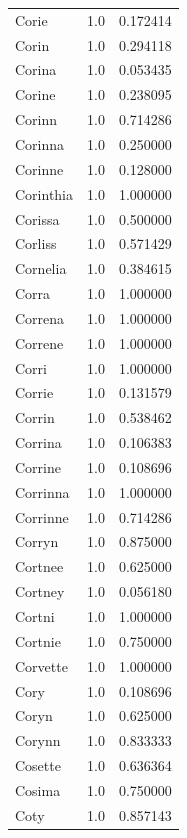 \documentclass[
  letterpaper,
  DIV=11,
  numbers=noendperiod]{scrreprt}
\begin{document}
\begin{tabular}{lrr}
Corie           &   1.0 &   0.172414 \\
Corin           &   1.0 &   0.294118 \\
Corina          &   1.0 &   0.053435 \\
Corine          &   1.0 &   0.238095 \\
Corinn          &   1.0 &   0.714286 \\
Corinna         &   1.0 &   0.250000 \\
Corinne         &   1.0 &   0.128000 \\
Corinthia       &   1.0 &   1.000000 \\
Corissa         &   1.0 &   0.500000 \\
Corliss         &   1.0 &   0.571429 \\
Cornelia        &   1.0 &   0.384615 \\
Corra           &   1.0 &   1.000000 \\
Correna         &   1.0 &   1.000000 \\
Correne         &   1.0 &   1.000000 \\
Corri           &   1.0 &   1.000000 \\
Corrie          &   1.0 &   0.131579 \\
Corrin          &   1.0 &   0.538462 \\
Corrina         &   1.0 &   0.106383 \\
Corrine         &   1.0 &   0.108696 \\
Corrinna        &   1.0 &   1.000000 \\
Corrinne        &   1.0 &   0.714286 \\
Corryn          &   1.0 &   0.875000 \\
Cortnee         &   1.0 &   0.625000 \\
Cortney         &   1.0 &   0.056180 \\
Cortni          &   1.0 &   1.000000 \\
Cortnie         &   1.0 &   0.750000 \\
Corvette        &   1.0 &   1.000000 \\
Cory            &   1.0 &   0.108696 \\
Coryn           &   1.0 &   0.625000 \\
Corynn          &   1.0 &   0.833333 \\
Cosette         &   1.0 &   0.636364 \\
Cosima          &   1.0 &   0.750000 \\
Coty            &   1.0 &   0.857143 \\

\end{tabular}
\end{document}
